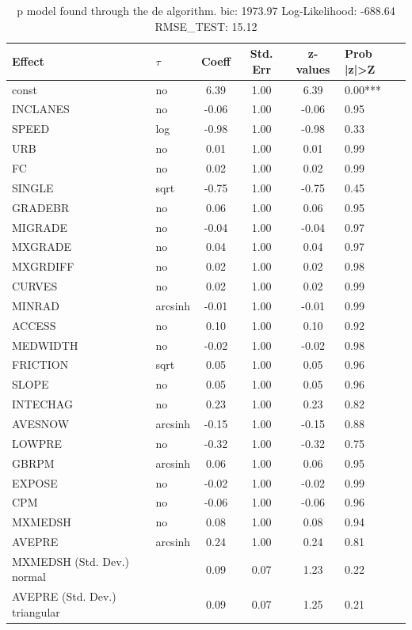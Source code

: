 \begin{table}
	\caption{p model found through the de algorithm. bic: 1973.97 Log-Likelihood: -688.64 RMSE_TEST: 15.12}
	\begin{center}
		\begin{tabular}{|l|l|c|c|c|l|}
			\hline
			Effect & $\tau$ & Coeff & Std. Err & z-values & Prob |z|>Z \\
			\hline
			const & no & 6.39 & 1.00 & 6.39 & 0.00*** \\
			\hline
			INCLANES & no & -0.06 & 1.00 & -0.06 & 0.95 \\
			\hline
			SPEED & log & -0.98 & 1.00 & -0.98 & 0.33 \\
			\hline
			URB & no & 0.01 & 1.00 & 0.01 & 0.99 \\
			\hline
			FC & no & 0.02 & 1.00 & 0.02 & 0.99 \\
			\hline
			SINGLE & sqrt & -0.75 & 1.00 & -0.75 & 0.45 \\
			\hline
			GRADEBR & no & 0.06 & 1.00 & 0.06 & 0.95 \\
			\hline
			MIGRADE & no & -0.04 & 1.00 & -0.04 & 0.97 \\
			\hline
			MXGRADE & no & 0.04 & 1.00 & 0.04 & 0.97 \\
			\hline
			MXGRDIFF & no & 0.02 & 1.00 & 0.02 & 0.98 \\
			\hline
			CURVES & no & 0.02 & 1.00 & 0.02 & 0.99 \\
			\hline
			MINRAD & arcsinh & -0.01 & 1.00 & -0.01 & 0.99 \\
			\hline
			ACCESS & no & 0.10 & 1.00 & 0.10 & 0.92 \\
			\hline
			MEDWIDTH & no & -0.02 & 1.00 & -0.02 & 0.98 \\
			\hline
			FRICTION & sqrt & 0.05 & 1.00 & 0.05 & 0.96 \\
			\hline
			SLOPE & no & 0.05 & 1.00 & 0.05 & 0.96 \\
			\hline
			INTECHAG & no & 0.23 & 1.00 & 0.23 & 0.82 \\
			\hline
			AVESNOW & arcsinh & -0.15 & 1.00 & -0.15 & 0.88 \\
			\hline
			LOWPRE & no & -0.32 & 1.00 & -0.32 & 0.75 \\
			\hline
			GBRPM & arcsinh & 0.06 & 1.00 & 0.06 & 0.95 \\
			\hline
			EXPOSE & no & -0.02 & 1.00 & -0.02 & 0.99 \\
			\hline
			CPM & no & -0.06 & 1.00 & -0.06 & 0.96 \\
			\hline
			MXMEDSH & no & 0.08 & 1.00 & 0.08 & 0.94 \\
			\hline
			AVEPRE & arcsinh & 0.24 & 1.00 & 0.24 & 0.81 \\
			\hline
			MXMEDSH (Std. Dev.) normal &  & 0.09 & 0.07 & 1.23 & 0.22 \\
			\hline
			AVEPRE (Std. Dev.) triangular &  & 0.09 & 0.07 & 1.25 & 0.21 \\
			\hline
		\end{tabular}
	\end{center}
\end{table}